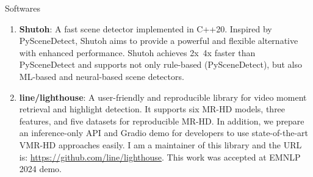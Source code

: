 \begin{rSection}{Softwares}
\begin{enumerate}
    \item \textbf{Shutoh}: A fast scene detector implemented in C++20. Inspired by PySceneDetect, Shutoh aims to provide a powerful and flexible alternative with enhanced performance. Shutoh achieves 2x~4x faster than PySceneDetect and supports not only rule-based (PySceneDetect), but also ML-based and neural-based scene detectors.
    \item \textbf{line/lighthouse}: A user-friendly and reproducible library for video moment retrieval and highlight detection. It supports six MR-HD models, three features, and five datasets for reproducible MR-HD. In addition, we prepare an inference-only API and Gradio demo for developers to use state-of-the-art VMR-HD approaches easily. I am a maintainer of this library and the URL is: \url{https://github.com/line/lighthouse}. This work was accepted at EMNLP 2024 demo.
\end{enumerate}
\end{rSection}